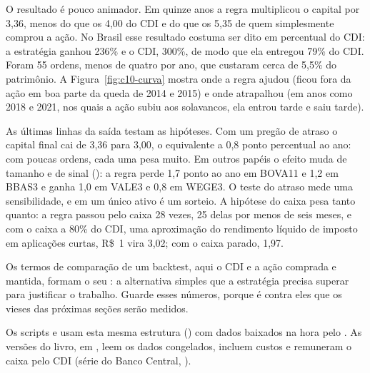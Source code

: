 O resultado é pouco animador. Em quinze anos a regra multiplicou o capital por 3,36, menos do que os 4,00 do CDI e do que os 5,35 de quem simplesmente comprou a ação. No Brasil esse resultado costuma ser dito em percentual do CDI: a estratégia ganhou 236\% e o CDI, 300\%, de modo que ela entregou 79\% do CDI. Foram 55 ordens, menos de quatro por ano, que custaram cerca de 5,5\% do patrimônio. A Figura~\ref{fig:c10-curva} mostra onde a regra ajudou (ficou fora da ação em boa parte da queda de 2014 e 2015) e onde atrapalhou (em anos como 2018 e 2021, nos quais a ação subiu aos solavancos, ela entrou tarde e saiu tarde).

As últimas linhas da saída testam as hipóteses. Com um pregão de atraso o capital final cai de 3,36 para 3,00, o equivalente a 0,8 ponto percentual ao ano: com poucas ordens, cada uma pesa muito. Em outros papéis o efeito muda de tamanho e de sinal (): a regra perde 1,7 ponto ao ano em BOVA11 e 1,2 em BBAS3 e ganha 1,0 em VALE3 e 0,8 em WEGE3. O teste do atraso mede uma sensibilidade, e em um único ativo é um sorteio. A hipótese do caixa pesa tanto quanto: a regra passou pelo caixa 28 vezes, 25 delas por menos de seis meses, e com o caixa a 80\% do CDI, uma aproximação do rendimento líquido de imposto em aplicações curtas, R\$~1 vira 3,02; com o caixa parado, 1,97.

Os termos de comparação de um backtest, aqui o CDI e a ação comprada e mantida, formam o seu : a alternativa simples que a estratégia precisa superar para justificar o trabalho. Guarde esses números, porque é contra eles que os vieses das próximas seções serão medidos.


\begin{repositorio}
Os scripts  e  usam esta mesma estrutura () com dados baixados na hora pelo . As versões do livro, em , leem os dados congelados, incluem custos e remuneram o caixa pelo CDI (série do Banco Central, ).
\end{repositorio}

